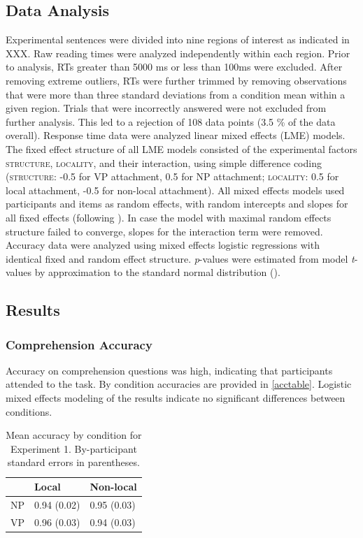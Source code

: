 \documentclass[12pt]{article}
\begin{document}
\subsection{Data Analysis}
\label{sec:analysis}

Experimental sentences were divided into nine regions of interest as indicated in XXX. Raw reading times were analyzed independently within each region. Prior to analysis, RTs greater than 5000 ms or less than 100ms were excluded. After removing extreme outliers, RTs were further trimmed by removing observations that were more than three standard deviations from a condition mean within a given region. Trials that were incorrectly answered were not excluded from further analysis. This led to a rejection of 108 data points (3.5 \% of the data overall). Response time data were analyzed linear mixed effects (LME) models. The fixed effect structure of all LME models consisted of the experimental factors \textsc{structure}, \textsc{locality}, and their interaction, using simple difference coding (\textsc{structure}: -0.5 for VP attachment,  0.5 for NP attachment;  \textsc{locality}: 0.5 for local attachment, -0.5 for non-local attachment). All mixed effects models used participants and items as random effects, with random intercepts and slopes for all fixed effects (following \cite{barr2013}). In case the model with maximal random effects structure failed to converge, slopes for the interaction term were removed. Accuracy data were analyzed using mixed effects logistic regressions with identical fixed and random effect structure. \textit{p}-values were estimated from model \textit{t}-values by approximation to the standard normal distribution (\cite{baayen2008}).   
  
\subsection{Results}
\label{sec:results}

\subsubsection{Comprehension Accuracy}
\label{sec:acc}

Accuracy on comprehension questions was high, indicating that participants attended to the task. By condition accuracies are provided in \ref{acctable}. Logistic mixed effects modeling of the results indicate no significant differences between conditions. 

\begin{table}[ht]
\centering
\begin{tabular}{rll}
  \hline
 & Local & Non-local \\ 
  \hline
NP & 0.94 (0.02) & 0.95 (0.03) \\ 
  VP & 0.96 (0.03) & 0.94 (0.03) \\ 
   \hline
\end{tabular}
\caption{Mean accuracy by condition for Experiment 1. By-participant standard errors in parentheses.} 
\end{table}
\end{document}
